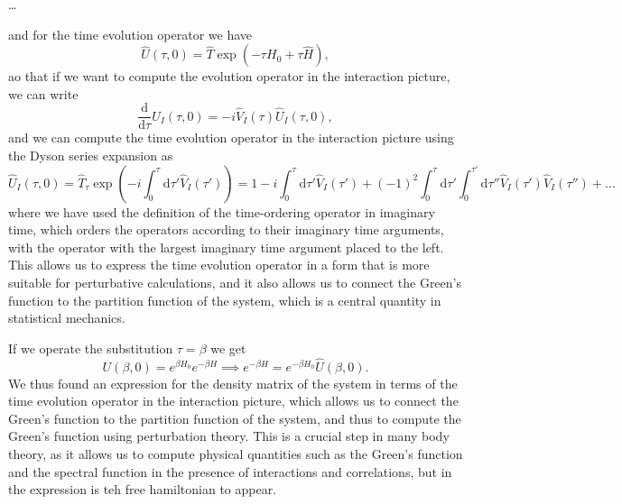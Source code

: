 \dots


and for the time evolution operator we have
\[
    \hat{U} (\tau, 0) = \hat{T} \exp\left( - \tau H_0 + \tau \hat{H} \right),
\]
ao that if we want to compute the evolution operator in the interaction picture, we can write
\[
    \frac{\mathrm{d}}{\mathrm{d} \tau} \hat{U}_I(\tau, 0) = -i \hat{V}_I(\tau) \hat{U}_I(\tau, 0),
\]
and we can compute the time evolution operator in the interaction picture using the Dyson series expansion as
\[
    \hat{U}_I(\tau, 0) = \hat{T}_{\tau}  \exp\left( -i \int_0^\tau \mathrm{d} \tau' \hat{V}_I(\tau') \right) = 1 - i \int_0^\tau \mathrm{d} \tau' \hat{V}_I(\tau') + (-1)^2 \int_0^\tau \mathrm{d} \tau' \int_0^{\tau'} \mathrm{d} \tau'' \hat{V}_I(\tau') \hat{V}_I(\tau'') + \dots
\]
where we have used the definition of the time-ordering operator in imaginary time, which orders the operators according to their imaginary time arguments, with the operator with the largest imaginary time argument placed to the left. This allows us to express the time evolution operator in a form that is more suitable for perturbative calculations, and it also allows us to connect the Green's function to the partition function of the system, which is a central quantity in statistical mechanics.

If we operate the substitution \(\tau = \beta\) we get
\[
    U(\beta, 0) = e^{\beta H_0} e^{- \beta H} \implies e^{-\beta H} = e^{-\beta H_0} \hat{U}(\beta, 0).
\]
We thus found an expression for the density matrix of the system in terms of the time evolution operator in the interaction picture, which allows us to connect the Green's function to the partition function of the system, and thus to compute the Green's function using perturbation theory. This is a crucial step in many body theory, as it allows us to compute physical quantities such as the Green's function and the spectral function in the presence of interactions and correlations, but in the expression is teh free hamiltonian to appear.

